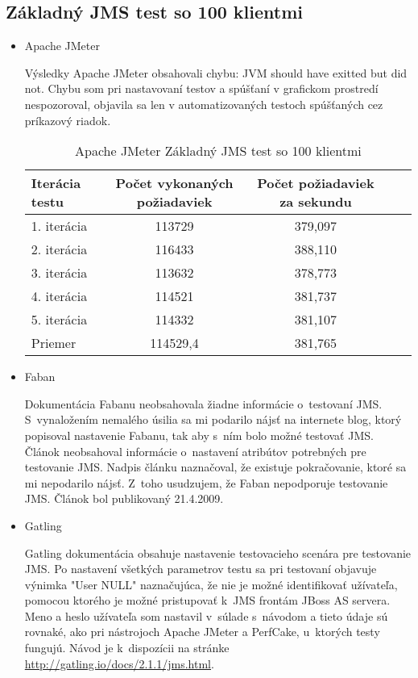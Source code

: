 \documentclass[12pt,oneside,final]{fithesis-utf8}
\begin{document}
\subsection{Základný JMS test so 100 klientmi}

\begin{itemize}

\item Apache JMeter

Výsledky Apache JMeter obsahovali chybu: JVM should have exitted but did not. Chybu som pri nastavovaní testov a spúšťaní v grafickom prostredí nespozoroval, objavila sa len v automatizovaných testoch spúšťaných cez príkazový riadok. 

\begin{table}[H]
\begin{center}
\begin{tabular}{ | l | c | c | c | c |}
		\hline
		 \textbf{Iterácia testu} & \textbf{Počet vykonaných požiadaviek} & \textbf{Počet požiadaviek za sekundu} \\ \hline
		 1. iterácia & 113729 & 379,097 \\ \hline
		 2. iterácia & 116433 & 388,110 \\ \hline
		 3. iterácia & 113632 & 378,773 \\ \hline
		 4. iterácia & 114521 & 381,737 \\ \hline
		 5. iterácia & 114332 & 381,107 \\ \hline
		 Priemer & 114529,4 & 381,765 \\ \hline
		 
\end{tabular}
\end{center}
\caption{Apache JMeter Základný JMS test so 100 klientmi}
\end{table}

\item Faban

Dokumentácia Fabanu neobsahovala žiadne informácie o~testovaní JMS. S~vynaložením nemalého úsilia sa mi podarilo nájsť na internete blog, ktorý popisoval nastavenie Fabanu, tak aby s~ním bolo možné testovať JMS. Článok neobsahoval informácie o~nastavení atribútov potrebných pre testovanie JMS. Nadpis článku naznačoval, že existuje pokračovanie, ktoré sa mi nepodarilo nájsť. Z~toho usudzujem, že Faban nepodporuje testovanie JMS. Článok bol publikovaný 21.4.2009\cite{FabanBlog}.

\item Gatling

Gatling dokumentácia obsahuje nastavenie testovacieho scenára pre testovanie JMS. Po nastavení všetkých parametrov testu sa pri testovaní objavuje výnimka "{}User NULL"{} naznačujúca, že nie je možné identifikovať užívateľa, pomocou ktorého je možné pristupovať k~JMS frontám JBoss AS servera. Meno a heslo užívateľa som nastavil v~súlade s~návodom a tieto údaje sú rovnaké, ako pri nástrojoch Apache JMeter a PerfCake, u~ktorých testy fungujú. Návod je k~dispozícii na stránke \url{http://gatling.io/docs/2.1.1/jms.html}.


\end{itemize}
\end{document}
